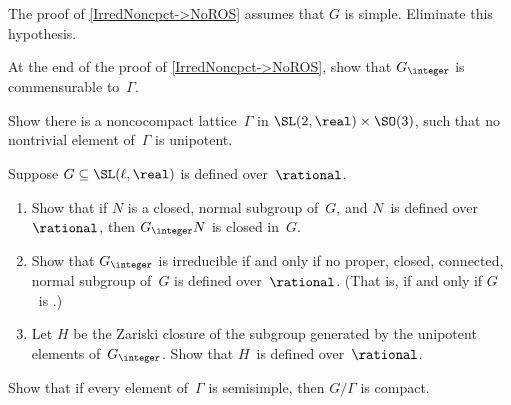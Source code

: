 \begin{exercises}

\item \label{NoROSPf-NotSimpleEx}
 The proof of \cref{IrredNoncpct->NoROS} assumes that $G$ is simple. Eliminate this hypothesis.
 
\item \label{NoROSPf-GZ=GammaEx}
 At the end of the proof of \cref{IrredNoncpct->NoROS}, show that $G_{\integer}$ is commensurable to~$\Gamma$.

\item \label{NonCocpctNoUnip}
 Show there is a noncocompact lattice~$\Gamma$ in
$\SL(2,\real) \times \SO(3)$, such that no nontrivial
element of~$\Gamma$ is unipotent.
\noprelistbreak %

\item Suppose $G \subseteq \SL(\ell,\real)$ is defined
over~$\rational$.
 \begin{enumerate}
 \item Show that if $N$ is a closed, normal subgroup of~$G$,
and $N$~is defined over~$\rational$, then $G_{\integer} N$
is closed in~$G$.
 \item Show that $G_{\integer}$ is irreducible if and only
if no proper, closed, connected, normal subgroup of~$G$ is
defined over~$\rational$. (That is, if and only if $G$~is
.)
 \item Let $H$ be the Zariski closure of the subgroup
generated by the unipotent elements of~$G_{\integer}$. Show
that $H$~is defined over~$\rational$.
 \end{enumerate}

\item \label{Cocpct->AllSS}
Show that if every element of~$\Gamma$ is semisimple, then $G/\Gamma$ is compact. 


\end{exercises}
